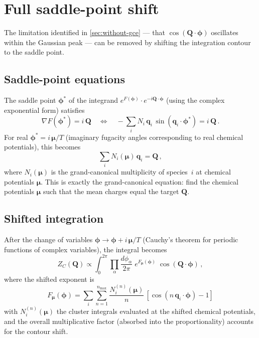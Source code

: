 \documentclass[11pt,a4paper]{article}
\newcommand{\bphi}{\bm{\phi}}
\newcommand{\bq}{\bm{q}}
\newcommand{\bQ}{\bm{Q}}
\begin{document}
\section{Full saddle-point shift}
\label{sec:full-shift}

The limitation identified in \cref{sec:without-gce} --- that $\cos(\bQ \cdot \bphi)$ oscillates within the Gaussian peak --- can be removed by shifting the integration contour to the saddle point.

\subsection{Saddle-point equations}

The saddle point $\bphi^*$ of the integrand $e^{F(\bphi)} \cdot e^{-i\bQ \cdot \bphi}$ (using the complex exponential form) satisfies
\begin{equation}\label{eq:saddle-eq}
  \nabla F(\bphi^*) = i\,\bQ
  \quad \Longleftrightarrow \quad
  -\sum_i N_i\,\bq_i\,\sin(\bq_i \cdot \bphi^*) = i\,\bQ\,.
\end{equation}
For real $\bphi^* = i\,\bm{\mu}/T$ (imaginary fugacity angles corresponding to real chemical potentials), this becomes
\begin{equation}\label{eq:gce-eq}
  \sum_i N_i(\bm{\mu})\,\bq_i = \bQ\,,
\end{equation}
where $N_i(\bm{\mu})$ is the grand-canonical multiplicity of species~$i$ at chemical potentials $\bm{\mu}$.
This is exactly the grand-canonical equation: find the chemical potentials $\bm{\mu}$ such that the mean charges equal the target $\bQ$.

\subsection{Shifted integration}

After the change of variables $\bphi \to \bphi + i\,\bm{\mu}/T$ (Cauchy's theorem for periodic functions of complex variables), the integral becomes
\begin{equation}\label{eq:ZC-shifted}
  Z_C(\bQ) \propto \int_0^{2\pi} \prod_\alpha \frac{d\phi_\alpha}{2\pi}\;
  e^{F_{\bm{\mu}}(\bphi)}\;\cos(\bQ \cdot \bphi)\,,
\end{equation}
where the shifted exponent is
\begin{equation}\label{eq:F-shifted}
  F_{\bm{\mu}}(\bphi) = \sum_i \sum_{n=1}^{n_{\max}} \frac{N_i^{(n)}(\bm{\mu})}{n}\,[\cos(n\,\bq_i \cdot \bphi) - 1]
\end{equation}
with $N_i^{(n)}(\bm{\mu})$ the cluster integrals evaluated at the shifted chemical potentials, and the overall multiplicative factor (absorbed into the proportionality) accounts for the contour shift.
\end{document}
